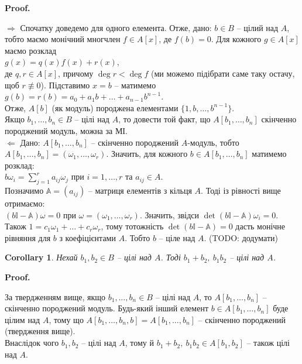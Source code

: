 \documentclass[a4paper, 10pt]{article}
\makeatletter
\def\rightproof{$\boxed{\Rightarrow}$ }
\def\leftproof{$\boxed{\Leftarrow}$ }
\theoremstyle{theoremdd}
\theoremstyle{theoremdd}
\theoremstyle{theoremdd}
\theoremstyle{theoremdd}
\theoremstyle{theoremdd}
\theoremstyle{theoremdd}
\theoremstyle{theoremdd}
\theoremstyle{theoremdd}
\theoremstyle{theoremdd}
\theoremstyle{theoremdd}
\theoremstyle{theoremdd}
\theoremstyle{theoremdd}
\theoremstyle{theoremdd}
\theoremstyle{theoremdd}
\newtheorem{corollary}[theorem]{Corollary}
\theoremstyle{theoremdd}
\renewenvironment{proof}[1][Proof.\\]{\par
\pushQED{\hfill \qed}%
\normalfont \topsep6\p@\@plus6\p@\relax
\trivlist
\item\relax
{\bfseries
#1\@addpunct{.}}\hspace\labelsep\ignorespaces
}{%
\popQED\endtrivlist\@endpefalse
}
\makeatother
\begin{document}
\begin{proof}
\rightproof Спочатку доведемо для одного елемента. Отже, дано: $b \in B$ -- цілий над $A$, тобто маємо монічний многчлен $f \in A[x]$, де $f(b) = 0$. Для кожного $g \in A[x]$ маємо розклад\\
$g(x) = q(x)f(x) + r(x)$,\\
де $q,r \in A[x]$, причому $\deg r < \deg f$ (ми можемо підібрати саме таку остачу, щоб $r \not\equiv 0$). Підставимо $x = b$ -- матимемо\\
$g(b) = r(b) = a_0 + a_1 b + \dots + a_{n-1} b^{n-1}$.\\
Отже, $A[b]$ (як модуль) породжена елементами $\{1,b,\dots,b^{n-1}\}$.\\
Якщо $b_1,\dots,b_n \in B$ -- цілі над $A$, то довести той факт, що $A[b_1,\dots,b_n]$ скінченно породжений модуль, можна за МІ.
\bigskip \\
\leftproof Дано: $A[b_1,\dots,b_n]$ -- скінченно породжений $A$-модуль, тобто $A[b_1,\dots,b_n] = (\omega_1,\dots,\omega_r)$. Значить, для кожного $b \in A[b_1,\dots,b_n]$ матимемо розклад:\\
$b \omega_i = \displaystyle\sum_{j=1}^r a_{ij} \omega_j$ при $i = 1,\dots,r$ та $a_{ij} \in A$.\\
Позначимо $\mathbb{A} = (a_{ij})$ -- матриця елементів з кільця $A$. Тоді із рівності вище отримаємо:\\
$(b\mathbb{I} - \mathbb{A}) \omega = 0$ при $\omega = (\omega_1,\dots,\omega_r)$. Значить, звідси $\det (b \mathbb{I} - \mathbb{A}) \omega_i = 0$.\\
Також $1 = c_1 \omega_1 + \dots + c_r \omega_r$, тому тотожність $\det (b \mathbb{I} - \mathbb{A}) = 0$ дасть монічне рівняння для $b$ з коефіцієнтами $A$. Тобто $b$ -- ціле над $A$.
(TODO: додумати)
\end{proof}

\begin{corollary}
Нехай $b_1,b_2 \in B$ -- цілі над $A$. Тоді $b_1 + b_2,\ b_1 b_2$ -- цілі над $A$.
\end{corollary}

\begin{proof}
За твердженням вище, якщо $b_1,\dots,b_n \in B$ -- цілі над $A$, то $A[b_1,\dots,b_n]$ -- скінченно породжений модуль. Будь-який інший елемент $b \in A[b_1,\dots,b_n]$ буде цілим над $A$, тому що $A[b_1,\dots,b_n,b] = A[b_1,\dots,b_n]$ -- скінченно породжений (твердження вище).\\
Внаслідок чого $b_1,b_2$ -- цілі над $A$, тому й $b_1 + b_2,\ b_1 b_2 \in A[b_1,b_2]$ -- також цілі над $A$.
\end{proof}
\end{document}
